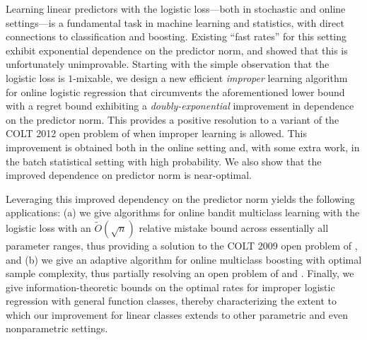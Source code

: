 
 Learning linear predictors with the logistic loss---both in stochastic and online settings---is a fundamental task in machine learning and statistics, with direct connections to classification and boosting. Existing ``fast rates'' for this setting exhibit exponential dependence on the predictor norm, and \cite{hazan2014logistic} showed that this is unfortunately unimprovable. Starting with the simple observation that the logistic loss is $1$-mixable, we design a new efficient \emph{improper} learning algorithm for online logistic regression that circumvents the aforementioned lower bound with a regret bound exhibiting a \emph{doubly-exponential} improvement in dependence on the predictor norm. This provides a positive resolution to a variant of the COLT 2012 open problem of \citet{mcmahan2012open} when improper learning is allowed. This improvement is obtained both in the online setting and, with some extra work, in the batch statistical setting with high probability. We also show that the improved dependence on predictor norm is near-optimal. 
 
 Leveraging this improved dependency on the predictor norm yields the following applications: (a) we give algorithms for online bandit multiclass learning with the logistic loss with an $\tilde{O}(\sqrt{n})$ relative mistake bound across essentially all parameter ranges, thus providing a solution to the COLT 2009 open problem of \citet{abernethyR09a}, and (b) we give an adaptive algorithm for online multiclass boosting with optimal sample complexity, thus partially resolving an open problem of \citet{beygelzimer2015optimal} and \citet{jung2017onlinemulticlass}. Finally, we give information-theoretic bounds on the optimal rates for improper logistic regression with general function classes, thereby characterizing the extent to which our improvement for linear classes extends to other parametric and even nonparametric settings.
